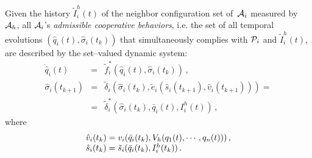 \documentclass[journal, onecolumn, 12pt]{styles/IEEEtran}
\begin{document}
Given the history $\tilde{I}_i^h(t)$ of the neighbor configuration set of~$\ai$ measured by $\ah$, all $\ai$'s {\em admissible cooperative behaviors}, i.e. the set of all temporal evolutions $(\hat{q}_i(t), \hat\sigma_i(t_k))$ that simultaneously complies with $\P_i$ and $\tilde{I}_i^h(t)$, are described by the set--valued dynamic system:
$$
\begin{array}{rcl}
\dot{\hat{q}}_i(t) & = & \tilde{f}^*_i(\hat{q}_i(t), \hat{\sigma}_i(t_k)) \, , \\
\hat{\sigma}_i(t_{k+1})  & = & \tilde{\delta}_i(\hat{\sigma}_i(t_k), \tilde{e}_i(\hat{s}_i(t_{k+1}), \hat{v}_i(t_{k+1}))) = \\
& = & \tilde{\delta}^*_i(\hat{\sigma}_i(t_k), \bar{q}_i(t), I_i^h(t)) \, , 
\end{array}
$$
where 
$$
\begin{array}{l}
\hat{v}_i(t_k) = v_i(\bar{q}_i(t_k), \vh(q_1(t), \cdots, q_n(t))) \, , \\
\hat{s}_i(t_k) = \tilde{s}_i(\bar{q}_i(t_k), I_i^h(t_k)) \, .
\end{array}
$$
\end{document}
